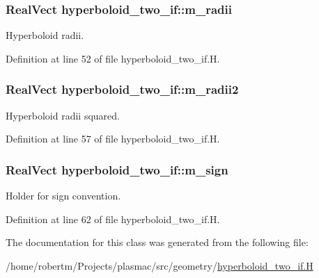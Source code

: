 \subsubsection[{\texorpdfstring{m\+\_\+radii}{m_radii}}]{\setlength{\rightskip}{0pt plus 5cm}Real\+Vect hyperboloid\+\_\+two\+\_\+if\+::m\+\_\+radii\hspace{0.3cm}{\ttfamily [protected]}}\hypertarget{classhyperboloid__two__if_acb9460af1dd4d0b3fc53a7c128f49df6}{}\label{classhyperboloid__two__if_acb9460af1dd4d0b3fc53a7c128f49df6}


Hyperboloid radii. 



Definition at line 52 of file hyperboloid\+\_\+two\+\_\+if.\+H.

\subsubsection[{\texorpdfstring{m\+\_\+radii2}{m_radii2}}]{\setlength{\rightskip}{0pt plus 5cm}Real\+Vect hyperboloid\+\_\+two\+\_\+if\+::m\+\_\+radii2\hspace{0.3cm}{\ttfamily [protected]}}\hypertarget{classhyperboloid__two__if_a9ac1a5e43471c84fb40e8158719d6d41}{}\label{classhyperboloid__two__if_a9ac1a5e43471c84fb40e8158719d6d41}


Hyperboloid radii squared. 



Definition at line 57 of file hyperboloid\+\_\+two\+\_\+if.\+H.

\subsubsection[{\texorpdfstring{m\+\_\+sign}{m_sign}}]{\setlength{\rightskip}{0pt plus 5cm}Real\+Vect hyperboloid\+\_\+two\+\_\+if\+::m\+\_\+sign\hspace{0.3cm}{\ttfamily [protected]}}\hypertarget{classhyperboloid__two__if_af60760b5d5371bdfa8a56eba172961f2}{}\label{classhyperboloid__two__if_af60760b5d5371bdfa8a56eba172961f2}


Holder for sign convention. 



Definition at line 62 of file hyperboloid\+\_\+two\+\_\+if.\+H.



The documentation for this class was generated from the following file\+:\begin{DoxyCompactItemize}
\item 
/home/robertm/\+Projects/plasmac/src/geometry/\hyperlink{hyperboloid__two__if_8H}{hyperboloid\+\_\+two\+\_\+if.\+H}\end{DoxyCompactItemize}
